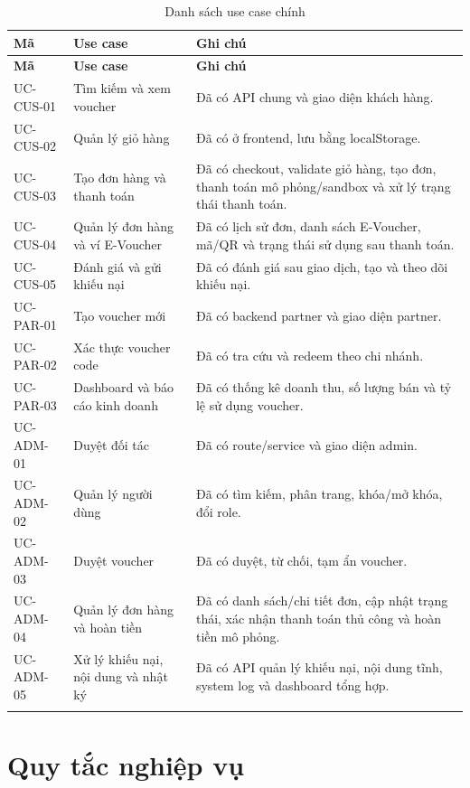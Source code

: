 \begin{longtable}{|p{2.8cm}|p{5.3cm}|p{6.2cm}|}
\hline
\textbf{Mã} & \textbf{Use case} & \textbf{Ghi chú} \\ \hline
\endfirsthead
\hline
\textbf{Mã} & \textbf{Use case} & \textbf{Ghi chú} \\ \hline
\endhead
UC-CUS-01 & Tìm kiếm và xem voucher & Đã có API chung và giao diện khách hàng. \\ \hline
UC-CUS-02 & Quản lý giỏ hàng & Đã có ở frontend, lưu bằng localStorage. \\ \hline
UC-CUS-03 & Tạo đơn hàng và thanh toán & Đã có checkout, validate giỏ hàng, tạo đơn, thanh toán mô phỏng/sandbox và xử lý trạng thái thanh toán. \\ \hline
UC-CUS-04 & Quản lý đơn hàng và ví E-Voucher & Đã có lịch sử đơn, danh sách E-Voucher, mã/QR và trạng thái sử dụng sau thanh toán. \\ \hline
UC-CUS-05 & Đánh giá và gửi khiếu nại & Đã có đánh giá sau giao dịch, tạo và theo dõi khiếu nại. \\ \hline
UC-PAR-01 & Tạo voucher mới & Đã có backend partner và giao diện partner. \\ \hline
UC-PAR-02 & Xác thực voucher code & Đã có tra cứu và redeem theo chi nhánh. \\ \hline
UC-PAR-03 & Dashboard và báo cáo kinh doanh & Đã có thống kê doanh thu, số lượng bán và tỷ lệ sử dụng voucher. \\ \hline
UC-ADM-01 & Duyệt đối tác & Đã có route/service và giao diện admin. \\ \hline
UC-ADM-02 & Quản lý người dùng & Đã có tìm kiếm, phân trang, khóa/mở khóa, đổi role. \\ \hline
UC-ADM-03 & Duyệt voucher & Đã có duyệt, từ chối, tạm ẩn voucher. \\ \hline
UC-ADM-04 & Quản lý đơn hàng và hoàn tiền & Đã có danh sách/chi tiết đơn, cập nhật trạng thái, xác nhận thanh toán thủ công và hoàn tiền mô phỏng. \\ \hline
UC-ADM-05 & Xử lý khiếu nại, nội dung và nhật ký & Đã có API quản lý khiếu nại, nội dung tĩnh, system log và dashboard tổng hợp. \\ \hline
\caption[]{Danh sách use case chính}\\
\end{longtable}

\section{Quy tắc nghiệp vụ}

